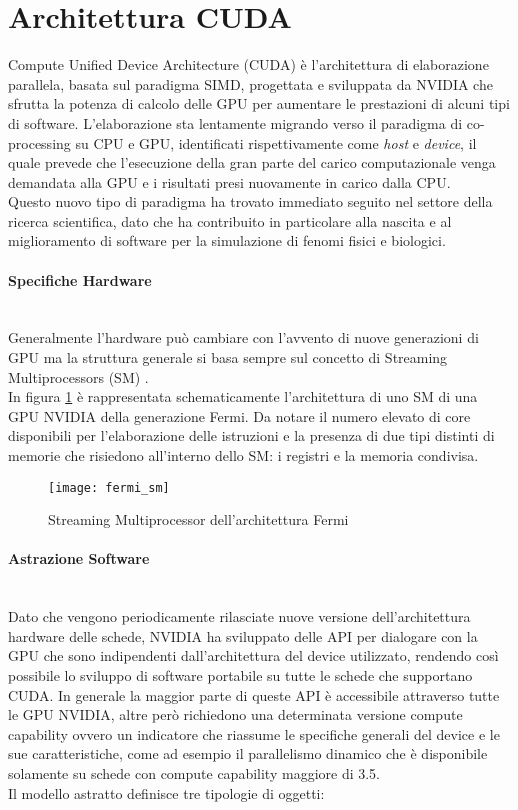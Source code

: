\section{Architettura CUDA}

Compute Unified Device Architecture (CUDA) è l'architettura di elaborazione
parallela, basata sul paradigma SIMD,
progettata e sviluppata da NVIDIA che sfrutta la potenza di calcolo delle GPU
per aumentare le prestazioni di alcuni tipi di software.
L'elaborazione sta lentamente migrando verso il paradigma di 
co-processing su CPU e GPU, identificati rispettivamente come
\textit{host} e \textit{device}, il quale prevede che l'esecuzione della
gran parte del carico computazionale venga demandata alla GPU e i risultati
presi nuovamente in carico dalla CPU.
\\
Questo nuovo tipo di paradigma ha trovato immediato seguito nel settore
della ricerca scientifica, dato che ha contribuito in particolare alla nascita
e al miglioramento di software per la simulazione di fenomi fisici e
biologici.

\paragraph{Specifiche Hardware}\mbox{}
\\
Generalmente l'hardware può cambiare con l'avvento di
nuove generazioni di GPU ma la struttura generale si basa sempre sul concetto di
Streaming Multiprocessors (SM) \cite{nickolls2010gpu}.
\\
In figura \ref{fig:fermi-arch} è rappresentata schematicamente l'architettura
di uno SM di una GPU NVIDIA della generazione Fermi. Da notare il
numero elevato di core disponibili per l'elaborazione delle istruzioni e la
presenza di due tipi distinti di memorie che risiedono all'interno dello SM:
i registri e la memoria condivisa.

\begin{figure}[t]
    \centering
    \texttt{[image: fermi\_sm]}
    \caption{Streaming Multiprocessor dell'architettura Fermi 
        \cite{nickolls2010gpu}}
    \label{fig:fermi-arch}
\end{figure}

\paragraph{Astrazione Software}\mbox{}
\\
Dato che vengono periodicamente rilasciate nuove versione dell'architettura
hardware delle schede, NVIDIA ha sviluppato delle API per dialogare con la GPU
che sono indipendenti dall'architettura del device utilizzato, rendendo
così possibile lo sviluppo di software portabile su tutte le schede che
supportano CUDA. In generale la maggior parte di queste API è accessibile
attraverso tutte le GPU NVIDIA, altre però richiedono una determinata versione
compute capability ovvero un indicatore che riassume le specifiche
generali del device e le sue caratteristiche, come ad esempio il parallelismo
dinamico che è disponibile solamente su schede con compute capability maggiore
di 3.5.
\\
Il modello astratto definisce tre tipologie di oggetti:

